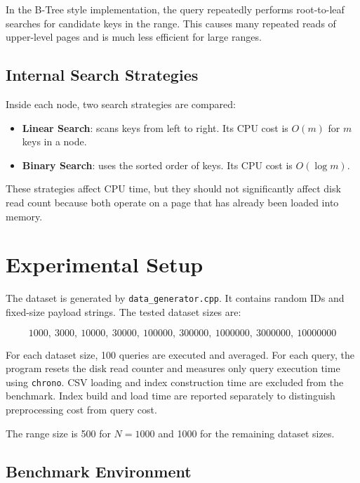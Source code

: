 \documentclass[12pt,a4paper]{article}
\begin{document}
In the B-Tree style implementation, the query repeatedly performs root-to-leaf searches for candidate keys in the range. This causes many repeated reads of upper-level pages and is much less efficient for large ranges.

\subsection{Internal Search Strategies}

Inside each node, two search strategies are compared:

\begin{itemize}
    \item \textbf{Linear Search}: scans keys from left to right. Its CPU cost is $O(m)$ for $m$ keys in a node.
    \item \textbf{Binary Search}: uses the sorted order of keys. Its CPU cost is $O(\log m)$.
\end{itemize}

These strategies affect CPU time, but they should not significantly affect disk read count because both operate on a page that has already been loaded into memory.

\section{Experimental Setup}

The dataset is generated by \texttt{data\_generator.cpp}. It contains random IDs and fixed-size payload strings. The tested dataset sizes are:

\[
1000,\ 3000,\ 10000,\ 30000,\ 100000,\ 300000,\ 1000000,\ 3000000,\ 10000000
\]

For each dataset size, 100 queries are executed and averaged. For each query, the program resets the disk read counter and measures only query execution time using \texttt{chrono}. CSV loading and index construction time are excluded from the benchmark. Index build and load time are reported separately to distinguish preprocessing cost from query cost.

The range size is 500 for $N=1000$ and 1000 for the remaining dataset sizes.

\subsection{Benchmark Environment}
\end{document}
